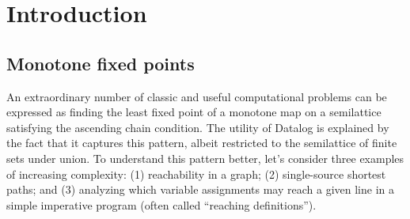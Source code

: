 \chapter{Introduction}


\section{Monotone fixed points}


An extraordinary number of classic and useful computational problems can be
expressed as finding the least fixed point of a monotone map on a semilattice
satisfying the ascending chain condition. The utility of Datalog is explained by
the fact that it captures this pattern, albeit restricted to the semilattice of
finite sets under union. To understand this pattern better, let's consider three
examples of increasing complexity:
%
(1) reachability in a graph;
(2) single-source shortest paths;
and (3) analyzing which variable assignments may reach a given line in a simple
imperative program (often called ``reaching definitions'').



